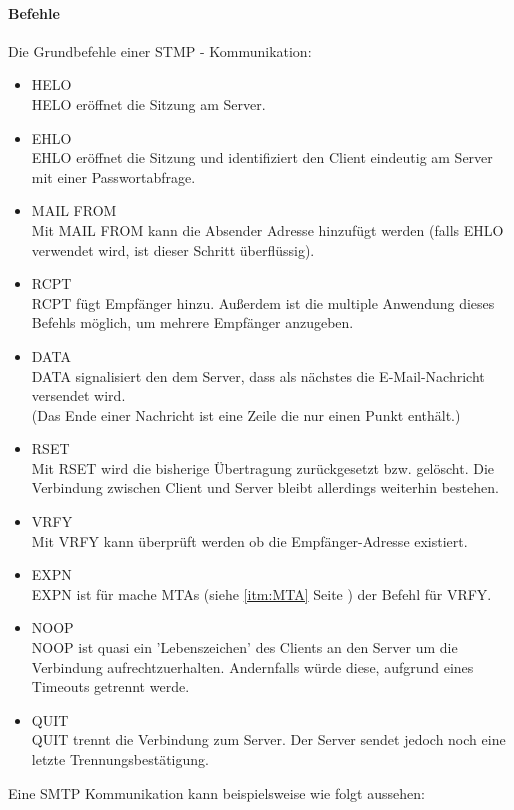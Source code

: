 \documentclass[12pt,a4paper]{report}
\begin{document}
\begin{onehalfspace}
\paragraph{Befehle\\}
Die Grundbefehle einer STMP - Kommunikation:
\begin{itemize}
\item HELO\\
HELO eröffnet die Sitzung am Server.
\item EHLO\\
EHLO eröffnet die Sitzung und identifiziert den Client eindeutig am Server mit einer Passwortabfrage.
\item MAIL FROM\\
Mit MAIL FROM kann die Absender Adresse hinzufügt werden (falls EHLO verwendet wird, ist dieser Schritt überflüssig).
\item RCPT\\
RCPT fügt Empfänger hinzu. Außerdem ist die multiple Anwendung dieses Befehls möglich, um mehrere Empfänger anzugeben. 
\item DATA\\
DATA signalisiert den dem Server, dass als nächstes die E-Mail-Nachricht versendet wird. \\
(Das Ende einer Nachricht ist eine Zeile die nur einen Punkt enthält.) 
\item RSET\\
Mit RSET wird die bisherige Übertragung zurückgesetzt bzw. gelöscht. Die Verbindung zwischen Client und Server bleibt allerdings weiterhin bestehen.
\item VRFY\\
Mit VRFY kann überprüft werden ob die Empfänger-Adresse existiert.
\item EXPN\\
EXPN ist für mache MTAs (siehe \ref{itm:MTA} Seite \pageref{itm:MTA}) der Befehl für VRFY.
\item NOOP\\
NOOP ist quasi ein 'Lebenszeichen' des Clients an den Server um die Verbindung aufrechtzuerhalten. Andernfalls würde diese, aufgrund eines Timeouts getrennt werde.
\item QUIT\\
QUIT trennt die Verbindung zum Server. Der Server sendet jedoch noch eine letzte Trennungsbestätigung.
\end{itemize}
\newpage
Eine SMTP Kommunikation kann beispielsweise wie folgt aussehen:
\begin{center}

\end{center}
\end{onehalfspace}
\end{document}
